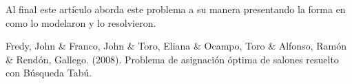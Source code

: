 \documentclass[12pt,letterpaper]{article}
\begin{document}
Al final este artículo aborda este problema a su manera presentando la forma en como lo modelaron y
lo resolvieron.




\begin{thebibliography}{}

    \bibitem{}
    Fredy, John \& Franco, John \& Toro, Eliana \& Ocampo, Toro \& Alfonso, Ramón \& Rendón, Gallego. (2008).
    Problema de asignación óptima de salones resuelto con Búsqueda Tabú. 

\end{thebibliography}
\end{document}
